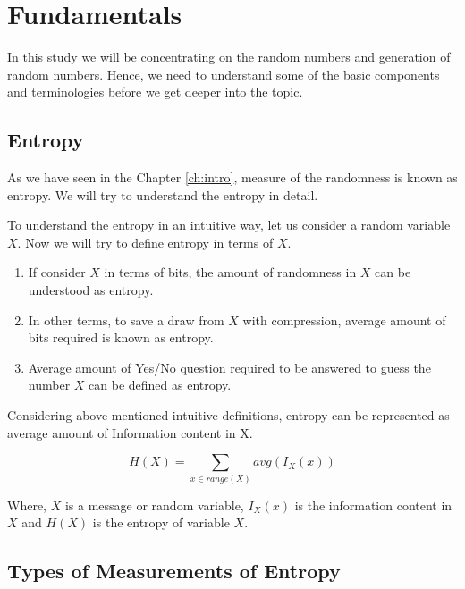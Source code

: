 \chapter{Fundamentals}
\label{ch:fundamentals}

In this study we will be concentrating on the random numbers and generation of random numbers. Hence, we need to understand some of the basic components and terminologies before we get deeper into the topic.

%
%
\section{Entropy}
\label{sec:fundamentals:entropy}

As we have seen in the Chapter \ref{ch:intro}, measure of the randomness is known as entropy. We will try to understand the entropy in detail.

To understand the entropy in an intuitive way, let us consider a random variable $X$. Now we will try to define entropy in terms of $X$.

\begin{enumerate}
	\item If consider $X$ in terms of bits, the amount of randomness in $X$ can be understood as entropy.
	\item In other terms, to save a draw from $X$ with compression, average amount of bits required is known as entropy.
	\item Average amount of Yes/No question required to be answered to guess the number $X$ can be defined as entropy.
\end{enumerate}

Considering above mentioned intuitive definitions, entropy can be represented as average amount of Information content in X. 

\begin{equation}
\label{eq:2:1}
H(X) = \sum_{x \in range(X)}  avg(I_{X}(x))
\end{equation}

Where, $X$ is a message or random variable, $I_{X}(x)$ is the information content in $X$ and $H(X)$ is the entropy of variable $X$.

%
%
\section{Types of Measurements of Entropy} 
\label{sec:fundamentals:types}

